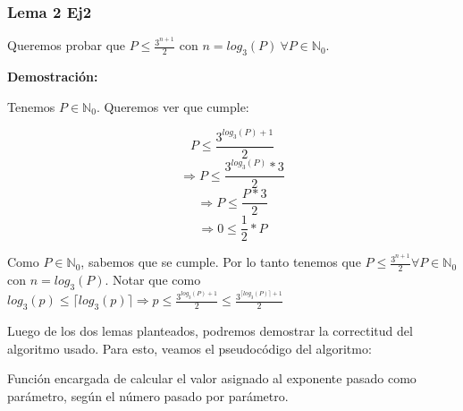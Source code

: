 \subsubsection{Lema 2 Ej2}
\label{ssub: lema_ej2_2}

\par Queremos probar que $P \leq \frac{3^{n + 1}}{2}$ con $n = log_{3}(P)\ \forall P \in \mathds{N}_{0}$.

\medskip

\textbf{Demostración:}
\par Tenemos $P \in \mathds{N}_{0}$. Queremos ver que cumple:

\begin{equation}
	P \leq \frac{3^{log_{3}(P) + 1}}{2}
\end{equation}
\begin{equation}
	\Longrightarrow P \leq \frac{3^{log_{3}(P)} * 3}{2}
\end{equation}
\begin{equation}
	\Longrightarrow P \leq \frac{P * 3}{2}
\end{equation}
\begin{equation}
	\Longrightarrow 0 \leq \frac{1}{2} * P
\end{equation}
\par Como $P \in \mathds{N}_{0}$, sabemos que se cumple. Por lo tanto tenemos que $P \leq \frac{3^{n + 1}}{2} \forall P \in \mathds{N}_{0}$ con $n = log_{3}(P)$. Notar que como $log_3(p) \leq  \lceil log_3(p) \rceil \Longrightarrow p \leq \frac{3^{log_{3}(P) + 1}}{2} \leq \frac{3^{\lceil log_{3}(P) \rceil + 1}}{2}$


\bigskip

\par Luego de los dos lemas planteados, podremos demostrar la correctitud del algoritmo usado. Para esto, veamos el pseudocódigo del algoritmo:

\medskip

\SetAlgoLined
{}
\begin{algorithm}[H]
	\label{algo: pseudocodigo_ej2}
	\caption{Función encargada de calcular el valor asignado al exponente pasado como parámetro, según el número pasado por parámetro.}
\end{algorithm}

